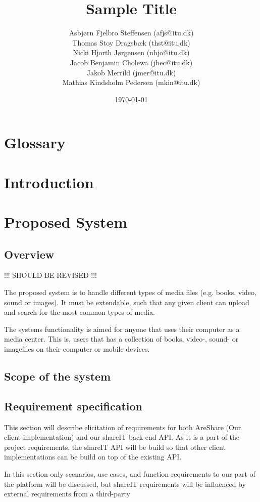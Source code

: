 \documentclass{report}
\title{Sample Title}
\date{\today}
\author{Asbj\o rn Fjelbro Steffensen (afjs@itu.dk)\\ Thomas Stoy Dragsb\ae k (thst@itu.dk)\\ Nicki Hjorth J\o rgensen (nhjo@itu.dk)\\ Jacob Benjamin Cholewa (jbec@itu.dk)\\ Jakob Merrild (jmer@itu.dk)\\ Mathias Kindsholm Pedersen (mkin@itu.dk)}
\begin{document}
\listoftodos[TODO]

\newpage
\tableofcontents

\chapter{Glossary}


\chapter{Introduction}


\newpage


\chapter{Proposed System}

\section{Overview}

!!! SHOULD BE REVISED !!!

The proposed system is to handle different types of media files (e.g. books, video, sound or images). It must be extendable, such that any given client can upload and search for the most common types of media.

The systems functionality is aimed for anyone that uses their computer as a media center. This is, users that has a collection of books, video-, sound- or imagefiles on their computer or mobile devices.

\section{Scope of the system}


\section{Requirement specification}

This section will describe elicitation of requirements for both AreShare (Our client implementation) and our shareIT back-end API. As it is a part of the project requirements, the shareIT API will be build so that other client implementations can be build on top of the existing API.

In this section only scenarios, use cases, and function requirements to our part of the platform will be discussed, but shareIT requirements will be influenced by external requirements from a third-party 
\end{document}
